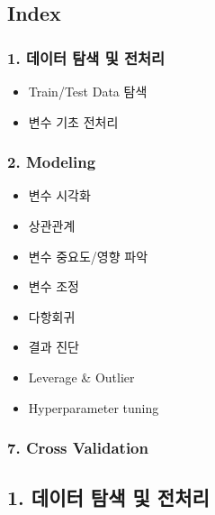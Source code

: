 \documentclass[11pt]{article}
\providecommand{\tightlist}{%
      \setlength{\itemsep}{0pt}\setlength{\parskip}{0pt}}
\begin{document}
    \hypertarget{index}{%
\subsection{Index}\label{index}}

\hypertarget{uxb370uxc774uxd130-uxd0d0uxc0c9-uxbc0f-uxc804uxcc98uxb9ac}{%
\subsubsection{1. 데이터 탐색 및
전처리}\label{uxb370uxc774uxd130-uxd0d0uxc0c9-uxbc0f-uxc804uxcc98uxb9ac}}

\begin{itemize}
\tightlist
\item
  Train/Test Data 탐색
\item
  변수 기초 전처리
\end{itemize}

\hypertarget{modeling}{%
\subsubsection{2. Modeling}\label{modeling}}

\begin{itemize}
\item
  변수 시각화
\item
  상관관계
\item
  변수 중요도/영향 파악
\item
  변수 조정
\item
  다항회귀
\item
  결과 진단
\item
  Leverage \& Outlier
\item
  Hyperparameter tuning
\end{itemize}

\hypertarget{cross-validation}{%
\subsubsection{7. Cross Validation}\label{cross-validation}}

    \hypertarget{uxb370uxc774uxd130-uxd0d0uxc0c9-uxbc0f-uxc804uxcc98uxb9ac}{%
\subsection{1. 데이터 탐색 및
전처리}\label{uxb370uxc774uxd130-uxd0d0uxc0c9-uxbc0f-uxc804uxcc98uxb9ac}}
\end{document}

